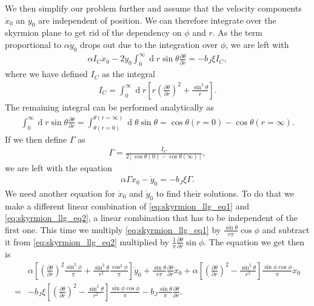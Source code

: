 \documentclass[12pt, a4paper]{article}		%
\renewcommand{\d}[1]{\ensuremath{\operatorname{d}\!{#1}}}
\numberwithin{equation}{section}
\begin{document}
We then simplify our problem further and assume that the velocity components $\dot{x}_0$ an $\dot{y}_0$ are independent of position. We can therefore integrate over the skyrmion plane to get rid of the dependency on $\phi$ and $r$. As the term proportional to $\alpha\dot{y}_0$ drops out due to the integration over $\phi$, we are left with
\begin{align}
\alpha I_C \dot{x}_0 - 2\dot{y}_0\int_0^{\infty}\d r \sin\theta\frac{\partial\theta}{\partial r} = -b_J\xi I_C,
\end{align}
where we have defined $I_C$ as the integral
\begin{align}
I_C = \int_0^{\infty} \d r \left[ r(\frac{\partial\theta}{\partial r})^2 + \frac{\sin^2\theta}{r}\right] .
\end{align}
The remaining integral can be performed analytically as
\begin{align}
\int_0^{\infty}\d r \sin\theta \frac{\partial\theta}{\partial r} = \int_{\theta(r =0)}^{\theta(r = \infty)}\d \theta \sin\theta = \cos\theta(r = 0) - \cos\theta (r = \infty).
\end{align}
If we then define $\Gamma$ as
\begin{align}
\label{eq:Gamma}
\Gamma = \frac{I_C}{2[\cos\theta(0)-\cos\theta(\infty)]},
\end{align}
we are left with the equation
\begin{align}
\label{eq:skyrmion_xy_eq1}
\alpha\Gamma \dot{x}_0 - \dot{y}_0 = -b_J\xi\Gamma.
\end{align}
We need another equation for $\dot{x}_0$ and $\dot{y}_0$ to find their solutions. To do that we make a different linear combination of \eqref{eq:skyrmion_llg_eq1} and \eqref{eq:skyrmion_llg_eq2}, a linear combination that has to be independent of the first one. This time we multiply \eqref{eq:skyrmion_llg_eq1} by $\frac{\sin\theta}{r \pi}\cos\phi$ and subtract it from \eqref{eq:skyrmion_llg_eq2} multiplied by $\frac{1}{\pi}\frac{\partial\theta}{\partial r}\sin\phi$. The equation we get then is
\begin{align}
\nonumber &\alpha\left[ (\frac{\partial\theta}{\partial r})^2\frac{\sin^2\phi}{\pi} + \frac{\sin^2\theta}{r^2}\frac{\cos^2\phi}{\pi}\right] \dot{y}_0 + \frac{\sin\theta}{r \pi}\frac{\partial\theta}{\partial r}\dot{x}_0 
+ \alpha \left[(\frac{\partial\theta}{\partial r})^2-\frac{\sin^2\theta}{r^2}\right]\frac{\sin\phi\cos\phi}{\pi}\dot{x}_0 \\
= &-b_J\xi\left[ (\frac{\partial\theta}{\partial r})^2 - \frac{\sin^2\theta}{r^2}\right]\frac{\sin\phi\cos\phi}{\pi} - b_J\frac{\sin\theta}{\pi}\frac{\partial\theta}{\partial r}.
\end{align}
\end{document}
